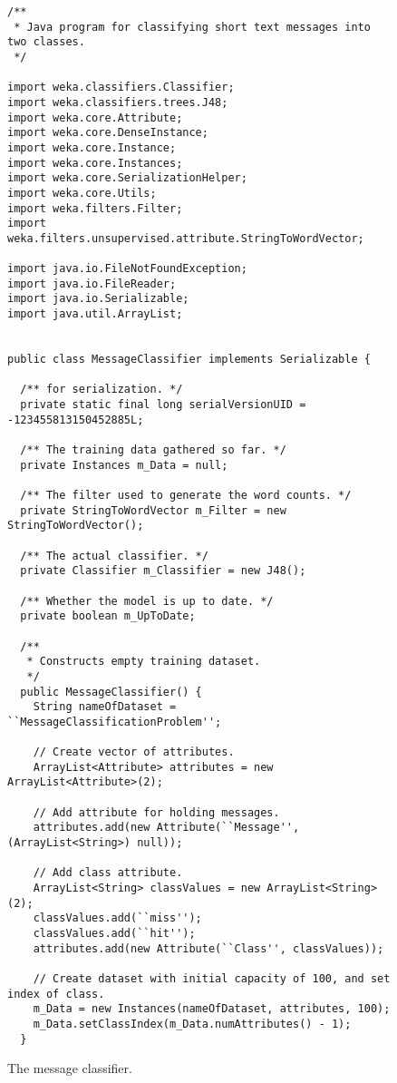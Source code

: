 \begin{figure}[!thp]
\begin{mdframed}[innermargin=-1cm]
\begin{Verbatim}[fontsize=\footnotesize]
/**
 * Java program for classifying short text messages into two classes.
 */

import weka.classifiers.Classifier;
import weka.classifiers.trees.J48;
import weka.core.Attribute;
import weka.core.DenseInstance;
import weka.core.Instance;
import weka.core.Instances;
import weka.core.SerializationHelper;
import weka.core.Utils;
import weka.filters.Filter;
import weka.filters.unsupervised.attribute.StringToWordVector;

import java.io.FileNotFoundException;
import java.io.FileReader;
import java.io.Serializable;
import java.util.ArrayList;


public class MessageClassifier implements Serializable {

  /** for serialization. */
  private static final long serialVersionUID = -123455813150452885L;

  /** The training data gathered so far. */
  private Instances m_Data = null;

  /** The filter used to generate the word counts. */
  private StringToWordVector m_Filter = new StringToWordVector();

  /** The actual classifier. */
  private Classifier m_Classifier = new J48();

  /** Whether the model is up to date. */
  private boolean m_UpToDate;

  /**
   * Constructs empty training dataset.
   */
  public MessageClassifier() {
    String nameOfDataset = ``MessageClassificationProblem'';

    // Create vector of attributes.
    ArrayList<Attribute> attributes = new ArrayList<Attribute>(2);

    // Add attribute for holding messages.
    attributes.add(new Attribute(``Message'', (ArrayList<String>) null));

    // Add class attribute.
    ArrayList<String> classValues = new ArrayList<String>(2);
    classValues.add(``miss'');
    classValues.add(``hit'');
    attributes.add(new Attribute(``Class'', classValues));

    // Create dataset with initial capacity of 100, and set index of class.
    m_Data = new Instances(nameOfDataset, attributes, 100);
    m_Data.setClassIndex(m_Data.numAttributes() - 1);
  }
\end{Verbatim}
\end{mdframed}
\caption{\label{fig:message_classifier}The message classifier.}
\end{figure}

